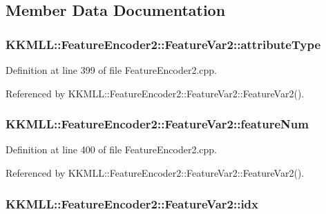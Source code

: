 \subsection{Member Data Documentation}
\subsubsection[{\texorpdfstring{attribute\+Type}{attributeType}}]{ K\+K\+M\+L\+L\+::\+Feature\+Encoder2\+::\+Feature\+Var2\+::attribute\+Type}\hypertarget{struct_feature_encoder2_1_1_feature_var2_ad657d80ae265a387fdeb63dfd67cd695}{}\label{struct_feature_encoder2_1_1_feature_var2_ad657d80ae265a387fdeb63dfd67cd695}


Definition at line 399 of file Feature\+Encoder2.\+cpp.



Referenced by K\+K\+M\+L\+L\+::\+Feature\+Encoder2\+::\+Feature\+Var2\+::\+Feature\+Var2().

\subsubsection[{\texorpdfstring{feature\+Num}{featureNum}}]{ K\+K\+M\+L\+L\+::\+Feature\+Encoder2\+::\+Feature\+Var2\+::feature\+Num}\hypertarget{struct_feature_encoder2_1_1_feature_var2_a66b3143d8e17e3f206d41c2c79b43bc3}{}\label{struct_feature_encoder2_1_1_feature_var2_a66b3143d8e17e3f206d41c2c79b43bc3}


Definition at line 400 of file Feature\+Encoder2.\+cpp.



Referenced by K\+K\+M\+L\+L\+::\+Feature\+Encoder2\+::\+Feature\+Var2\+::\+Feature\+Var2().

\subsubsection[{\texorpdfstring{idx}{idx}}]{ K\+K\+M\+L\+L\+::\+Feature\+Encoder2\+::\+Feature\+Var2\+::idx}\hypertarget{struct_feature_encoder2_1_1_feature_var2_aed5328bcecddd127ab569227fcf7a754}{}\label{struct_feature_encoder2_1_1_feature_var2_aed5328bcecddd127ab569227fcf7a754}


